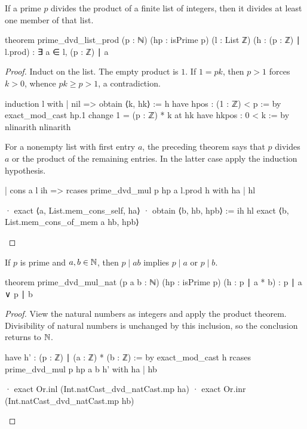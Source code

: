 \begin{corollary}
  \label{ent:cor:prime-divides-finite-product}
  If a prime $p$ divides the product of a finite list of integers, then it divides at least one
  member of that list.

  \begin{lean}
    theorem prime_dvd_list_prod (p : ℕ) (hp : isPrime p) (l : List ℤ)
        (h : (p : ℤ) ∣ l.prod) : ∃ a ∈ l, (p : ℤ) ∣ a
  \end{lean}
\end{corollary}

\begin{proof}
  Induct on the list.
  The empty product is $1$.
  If $1=pk$, then $p>1$ forces $k>0$, whence $pk\ge p>1$, a contradiction.

  \begin{lean}
    induction l with
    | nil =>
      obtain ⟨k, hk⟩ := h
      have hpos : (1 : ℤ) < p := by
        exact_mod_cast hp.1
      change 1 = (p : ℤ) * k at hk
      have hkpos : 0 < k := by
        nlinarith
      nlinarith
  \end{lean}

  For a nonempty list with first entry $a$, the preceding theorem says that $p$ divides $a$ or the
  product of the remaining entries.
  In the latter case apply the induction hypothesis.

  \begin{lean}
    | cons a l ih =>
      rcases prime_dvd_mul p hp a l.prod h with ha | hl

      · exact ⟨a, List.mem_cons_self, ha⟩
      · obtain ⟨b, hb, hpb⟩ := ih hl
        exact ⟨b, List.mem_cons_of_mem a hb, hpb⟩
  \end{lean}

\end{proof}

\begin{lemma}
  \label{ent:lem:prime-divides-natural-product}
  If $p$ is prime and $a,b\in\mathbb{N}$, then $p\mid ab$ implies $p\mid a$ or $p\mid b$.

  \begin{lean}
    theorem prime_dvd_mul_nat (p a b : ℕ) (hp : isPrime p) (h : p ∣ a * b) :
        p ∣ a ∨ p ∣ b
  \end{lean}
\end{lemma}

\begin{proof}
  View the natural numbers as integers and apply the product theorem.
  Divisibility of natural numbers is unchanged by this inclusion, so the conclusion returns to
  $\mathbb{N}$.

  \begin{lean}
    have h' : (p : ℤ) ∣ (a : ℤ) * (b : ℤ) := by
      exact_mod_cast h
    rcases prime_dvd_mul p hp a b h' with ha | hb

    · exact Or.inl (Int.natCast_dvd_natCast.mp ha)
    · exact Or.inr (Int.natCast_dvd_natCast.mp hb)
  \end{lean}

\end{proof}

